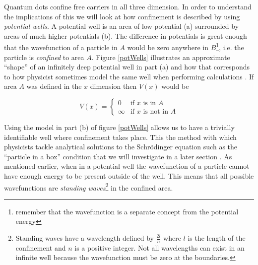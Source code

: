 \documentclass[authoryearcitations]{UoYCSproject}
\begin{document}
Quantum dots confine free carriers in all three dimension. In order to understand the implications
of this we will look at how confinement is described by using \emph{potential wells}. A potential
well is an area of low potential (a) surrounded by areas of much higher potentials (b). The difference 
in potentials is great enough that the wavefunction of a particle in $A$ would be zero anywhere in $B$\footnote{
remember that the wavefunction is a separate concept from the potential energy}, i.e.
the particle is \emph{confined} to area $A$. Figure \ref{potWells} illustrates an approximate ``shape'' of
an infinitely deep potential well in part (a) and how that corresponds to how physicist sometimes model
the same well when performing calculations \cite{dots, qp}. If area $A$ was defined in the $x$ dimension
then $V(x)$ would be

\begin{equation}
V(x) = \begin{cases}
          0 & \text{if $x$ is in $A$}  \\
          \infty    & \text{if $x$ is not in $A$} 
         \end{cases}
\label{vx}
\end{equation}


Using the model in part (b) of figure \ref{potWells} allows us to have a trivially identifiable well where confinement
takes place. This the method with which physicists tackle analytical solutions to the Schr\"{o}dinger equation 
such as the ``particle in a box'' condition that we will investigate in a later section \cite{datta, qp, dots}.  
As mentioned earlier, when in a potential well the wavefunction of a particle cannot have enough energy to be present
outside of the well. This means that all possible wavefunctions are \emph{standing waves}\footnote{Standing
waves have a wavelength defined by $\frac{2l}{n}$ where $l$ is the length of the confinement and $n$ is a positive integer. 
Not all wavelengths can exist in an infinite well because the wavefunction must be zero at the boundaries.} in the confined area.
\end{document}
